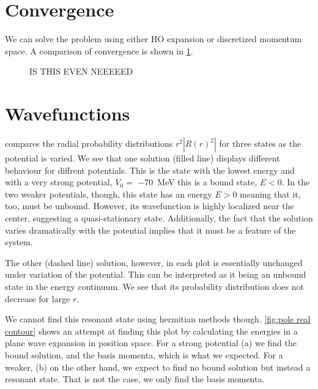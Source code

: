 \documentclass[../main/report.tex]{subfiles}
\begin{document}
\section{Convergence}
We can solve the problem using either HO expansion or discretized momentum space. A comparison of convergence is shown in \cref{fig:HO vs mom}.
\begin{figure}
  \centering
  \caption{IS THIS EVEN NEEEEED}
  \label{fig:HO vs mom}
\end{figure}

\section{Wavefunctions}


 compares the radial probability distributions $r^2|R(r)^2|$ for three states as the potential is varied.
 We see that one solution (filled line) displays different behaviour for diffrent potentials.
 This is the state with the lowest energy and with a very strong potential, $V_0 =$ \SI{-70}{MeV} this is a bound state, $E<0$. 
In the two weaker potentials, though, this state has an energy $E>0$ meaning that it, too, must be unbound. 
However, its wavefunction is highly localized near the center, suggesting a quasi-stationary state. 
Additionally, the fact that the solution varies dramatically with the potential implies that it must be a feature of the system.
 
The other (dashed line) solution, however, in each plot is essentially unchanged under variation of the potential. 
This can be interpreted as it being an unbound state in the energy continuum. We see that its probability distribution does not decrease for large $r$.

We cannot find this resonant state using hermitian methods though.
\cref{fig:pole real contour} shows an attempt at finding this plot by calculating the energies in a plane wave expansion in position space.
For a strong potential (a) we find the bound solution, and the basis momenta, which is what we expected.
For a weaker, (b) on the other hand, we expect to find no bound solution but instead a resonant state. 
That is not the case, we only find the basis momenta.

\end{document}
